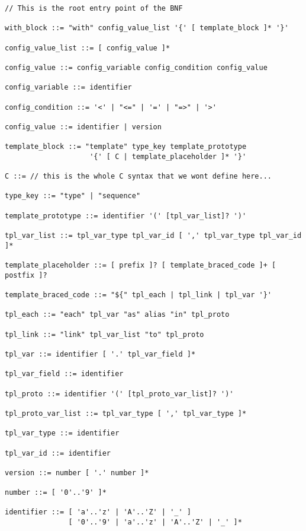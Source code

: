 \documentclass[american]{rtxreport}
\begin{document}
\lstset{}
\begin{lstlisting}
// This is the root entry point of the BNF

with_block ::= "with" config_value_list '{' [ template_block ]* '}'

config_value_list ::= [ config_value ]*

config_value ::= config_variable config_condition config_value

config_variable ::= identifier

config_condition ::= '<' | "<=" | '=' | "=>" | '>'

config_value ::= identifier | version

template_block ::= "template" type_key template_prototype
                    '{' [ C | template_placeholder ]* '}'

C ::= // this is the whole C syntax that we wont define here...

type_key ::= "type" | "sequence"

template_prototype ::= identifier '(' [tpl_var_list]? ')'

tpl_var_list ::= tpl_var_type tpl_var_id [ ',' tpl_var_type tpl_var_id ]*

template_placeholder ::= [ prefix ]? [ template_braced_code ]+ [ postfix ]?

template_braced_code ::= "${" tpl_each | tpl_link | tpl_var '}'

tpl_each ::= "each" tpl_var "as" alias "in" tpl_proto

tpl_link ::= "link" tpl_var_list "to" tpl_proto

tpl_var ::= identifier [ '.' tpl_var_field ]*

tpl_var_field ::= identifier

tpl_proto ::= identifier '(' [tpl_proto_var_list]? ')'

tpl_proto_var_list ::= tpl_var_type [ ',' tpl_var_type ]*

tpl_var_type ::= identifier

tpl_var_id ::= identifier

version ::= number [ '.' number ]*

number ::= [ '0'..'9' ]*

identifier ::= [ 'a'..'z' | 'A'..'Z' | '_' ]
               [ '0'..'9' | 'a'..'z' | 'A'..'Z' | '_' ]*

\end{lstlisting}
\end{document}
